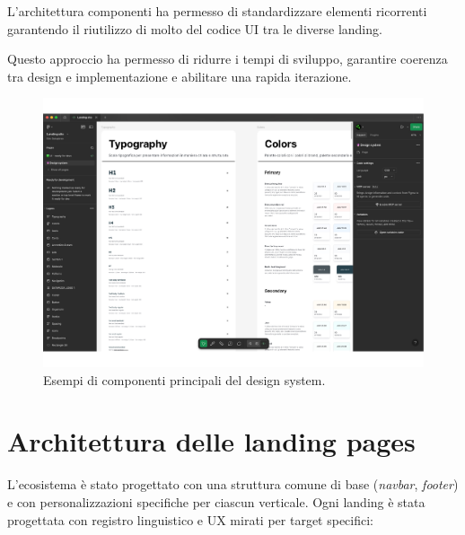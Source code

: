 L'architettura componenti ha permesso di standardizzare elementi ricorrenti garantendo il riutilizzo di molto del codice UI tra le diverse landing.

Questo approccio ha permesso di ridurre i tempi di sviluppo, garantire coerenza tra design e implementazione e abilitare una rapida iterazione.

\begin{figure}[h!]
    \centering
    \includegraphics[width=\textwidth]{chapters/figures/design-system.pdf}
    \caption{Esempi di componenti principali del design system.}
    \label{fig:design-system}
\end{figure}

\section{Architettura delle landing pages}
L'ecosistema è stato progettato con una struttura comune di base (\textit{navbar}, 
\textit{footer}) e con personalizzazioni specifiche per ciascun verticale. 
Ogni landing è stata progettata con registro linguistico e UX mirati per target 
specifici:

